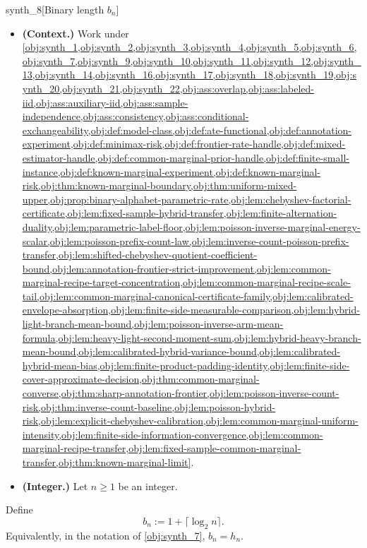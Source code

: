 \documentclass[11pt]{article}
\begin{document}
\begin{definitionv}{synth_8}[Binary length \(b_n\)]
\begin{itemize}
\item \textbf{(Context.)} Work under \cref{obj:synth_1,obj:synth_2,obj:synth_3,obj:synth_4,obj:synth_5,obj:synth_6,obj:synth_7,obj:synth_9,obj:synth_10,obj:synth_11,obj:synth_12,obj:synth_13,obj:synth_14,obj:synth_16,obj:synth_17,obj:synth_18,obj:synth_19,obj:synth_20,obj:synth_21,obj:synth_22,obj:ass:overlap,obj:ass:labeled-iid,obj:ass:auxiliary-iid,obj:ass:sample-independence,obj:ass:consistency,obj:ass:conditional-exchangeability,obj:def:model-class,obj:def:ate-functional,obj:def:annotation-experiment,obj:def:minimax-risk,obj:def:frontier-rate-handle,obj:def:mixed-estimator-handle,obj:def:common-marginal-prior-handle,obj:def:finite-small-instance,obj:def:known-marginal-experiment,obj:def:known-marginal-risk,obj:thm:known-marginal-boundary,obj:thm:uniform-mixed-upper,obj:prop:binary-alphabet-parametric-rate,obj:lem:chebyshev-factorial-certificate,obj:lem:fixed-sample-hybrid-transfer,obj:lem:finite-alternation-duality,obj:lem:parametric-label-floor,obj:lem:poisson-inverse-marginal-energy-scalar,obj:lem:poisson-prefix-count-law,obj:lem:inverse-count-poisson-prefix-transfer,obj:lem:shifted-chebyshev-quotient-coefficient-bound,obj:lem:annotation-frontier-strict-improvement,obj:lem:common-marginal-recipe-target-concentration,obj:lem:common-marginal-recipe-scale-tail,obj:lem:common-marginal-canonical-certificate-family,obj:lem:calibrated-envelope-absorption,obj:lem:finite-side-measurable-comparison,obj:lem:hybrid-light-branch-mean-bound,obj:lem:poisson-inverse-arm-mean-formula,obj:lem:heavy-light-second-moment-sum,obj:lem:hybrid-heavy-branch-mean-bound,obj:lem:calibrated-hybrid-variance-bound,obj:lem:calibrated-hybrid-mean-bias,obj:lem:finite-product-padding-identity,obj:lem:finite-side-cover-approximate-decision,obj:thm:common-marginal-converse,obj:thm:sharp-annotation-frontier,obj:lem:poisson-inverse-count-risk,obj:thm:inverse-count-baseline,obj:lem:poisson-hybrid-risk,obj:lem:explicit-chebyshev-calibration,obj:lem:common-marginal-uniform-intensity,obj:lem:finite-side-information-convergence,obj:lem:common-marginal-recipe-transfer,obj:lem:fixed-sample-common-marginal-transfer,obj:thm:known-marginal-limit}.
\item \textbf{(Integer.)} Let \(n\ge1\) be an integer.
\end{itemize}
Define
\[
b_n:=1+\lceil\log_2 n\rceil .
\]
Equivalently, in the notation of \cref{obj:synth_7}, \(b_n=h_n\).
\end{definitionv}
\end{document}

